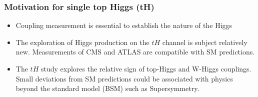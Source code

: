 \documentclass[11pt]{beamer}
\begin{document}
\begin{frame}
\frametitle{Motivation  for single top Higgs (tH)}
\begin{itemize}
\item Coupling measurement is essential to establish the nature of the Higgs
\item The exploration of Higgs production on the $tH$ channel is subject relatively new. Measurements of CMS and ATLAS are compatible with SM predictions.
\item The $tH$ study explores the relative sign of top-Higgs  and W-Higgs couplings.\\ Small deviations from SM predictions could be associated with physics beyond the
standard model (BSM) such as Supersymmetry.
\end{itemize}
\end{frame}
\end{document}
